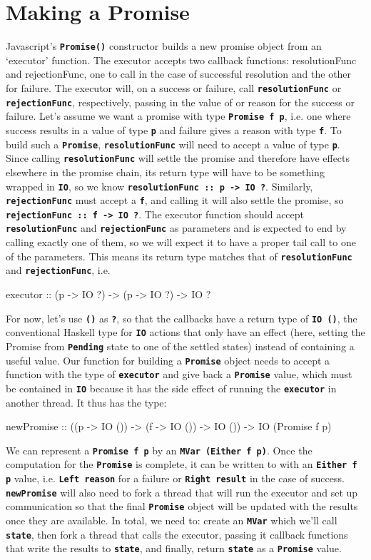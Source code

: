 \documentclass[12pt, english, letterpaper]{kuthesis}
\newcommand{\lit}[1]{\textbf{\texttt{#1}}}
\begin{document}
\section*{Making a Promise}
Javascript's \lit{Promise()} constructor builds a new promise object from an `executor' function.  The executor accepts two callback functions: resolutionFunc and rejectionFunc, one to call in the case of successful resolution and the other for failure.  The executor will, on a success or failure, call \lit{resolutionFunc} or \lit{rejectionFunc}, respectively, passing in the value of or reason for the success or failure.  Let's assume we want a promise with type \lit{Promise f p}, i.e. one where success results in a value of type \lit p and failure gives a reason with type \lit f.  To build such a \lit{Promise}, \lit{resolutionFunc} will need to accept a value of type \lit p.  Since calling \lit{resolutionFunc} will settle the promise and therefore have effects elsewhere in the promise chain, its return type will have to be something wrapped in \lit{IO}, so we know \lit{resolutionFunc ::\ p -> IO ?}.  Similarly, \lit{rejectionFunc} must accept a \lit f, and calling it will also settle the promise, so \lit{rejectionFunc ::\ f -> IO ?}.  The executor function should accept \lit{resolutionFunc} and \lit{rejectionFunc} as parameters and is expected to end by calling exactly one of them, so we will expect it to have a proper tail call to one of the parameters.  This means its return type matches that of \lit{resolutionFunc} and \lit{rejectionFunc}, i.e.
\begin{code}
executor :: (p -> IO ?) -> (p -> IO ?) -> IO ?
\end{code}
  For now, let's use \lit{()} as \lit ?, so that the callbacks have a return type of \lit{IO ()}, the conventional Haskell type for \lit{IO} actions that only have an effect (here, setting the Promise from \lit{Pending} state to one of the settled states) instead of containing a useful value.  Our function for building a \lit{Promise} object needs to accept a function with the type of \lit{executor} and give back a \lit{Promise} value, which must be contained in \lit{IO} because it has the side effect of running the \lit{executor} in another thread.  It thus has the type:
\begin{code}[xleftmargin=0em]
newPromise :: ((p -> IO ()) -> (f -> IO ()) -> IO ()) -> IO (Promise f p)
\end{code}
We can represent a \lit{Promise f p} by an \lit{MVar (Either f p)}.  Once the computation for the \lit{Promise} is complete, it can be written to with an \lit{Either f p} value, i.e. \lit{Left reason} for a failure or \lit{Right result} in the case of success.  \lit{newPromise} will also need to fork a thread that will run the executor and set up communication so that the final \lit{Promise} object will be updated with the results once they are available.  In total, we need to: create an \lit{MVar} which we'll call \lit{state}, then fork a thread that calls the executor, passing it callback functions that write the results to \lit{state}, and finally, return \lit{state} as a \lit{Promise} value.
\end{document}
